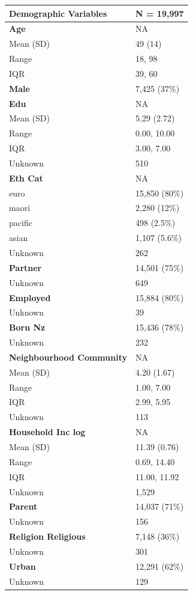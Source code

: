 \documentclass[
  single column]{article}
\begin{document}
\begin{longtable}[]{@{}ll@{}}
\toprule\noalign{}
\textbf{Demographic Variables} & \textbf{N = 19,997} \\
\midrule\noalign{}
\endhead
\bottomrule\noalign{}
\endlastfoot
\textbf{Age} & NA \\
Mean (SD) & 49 (14) \\
Range & 18, 98 \\
IQR & 39, 60 \\
\textbf{Male} & 7,425 (37\%) \\
\textbf{Edu} & NA \\
Mean (SD) & 5.29 (2.72) \\
Range & 0.00, 10.00 \\
IQR & 3.00, 7.00 \\
Unknown & 510 \\
\textbf{Eth Cat} & NA \\
euro & 15,850 (80\%) \\
maori & 2,280 (12\%) \\
pacific & 498 (2.5\%) \\
asian & 1,107 (5.6\%) \\
Unknown & 262 \\
\textbf{Partner} & 14,501 (75\%) \\
Unknown & 649 \\
\textbf{Employed} & 15,884 (80\%) \\
Unknown & 39 \\
\textbf{Born Nz} & 15,436 (78\%) \\
Unknown & 232 \\
\textbf{Neighbourhood Community} & NA \\
Mean (SD) & 4.20 (1.67) \\
Range & 1.00, 7.00 \\
IQR & 2.99, 5.95 \\
Unknown & 113 \\
\textbf{Household Inc log} & NA \\
Mean (SD) & 11.39 (0.76) \\
Range & 0.69, 14.40 \\
IQR & 11.00, 11.92 \\
Unknown & 1,529 \\
\textbf{Parent} & 14,037 (71\%) \\
Unknown & 156 \\
\textbf{Religion Religious} & 7,148 (36\%) \\
Unknown & 301 \\
\textbf{Urban} & 12,291 (62\%) \\
Unknown & 129 \\

\end{longtable}
\end{document}
